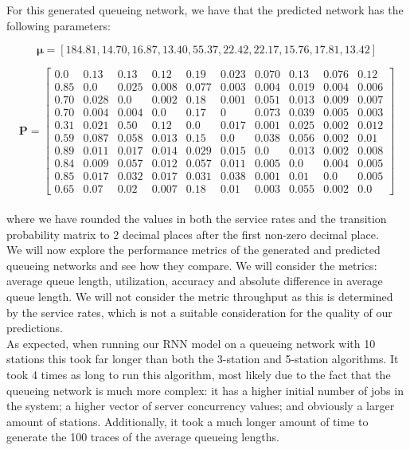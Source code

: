 \documentclass[a4paper,11pt,titlepage]{article}
\begin{document}
For this generated queueing network, we have that the predicted network has the following parameters: 

$$ \bm{\mu} = [184.81, 14.70, 16.87, 13.40, 55.37, 22.42, 22.17, 15.76, 17.81, 13.42]$$

$$\mathbf{P} = \begin{bmatrix}
0.0 & 0.13 & 0.13 & 0.12 & 0.19 & 0.023 & 0.070 & 0.13 & 0.076 & 0.12\\
0.85 & 0.0 & 0.025 & 0.008 & 0.077 & 0.003 & 0.004 & 0.019 & 0.004 & 0.006\\
0.70 & 0.028 & 0.0 & 0.002 & 0.18 & 0.001 & 0.051 & 0.013 & 0.009 & 0.007 \\
0.70 & 0.004 & 0.004 & 0.0 & 0.17 & 0 & 0.073 & 0.039 & 0.005 & 0.003 \\
0.31 & 0.021 & 0.50 & 0.12 & 0.0 & 0.017 & 0.001 & 0.025 & 0.002 & 0.012 \\
0.59 & 0.087 & 0.058 & 0.013 & 0.15 & 0.0 & 0.038 & 0.056 & 0.002 & 0.01 \\
0.89 & 0.011 & 0.017 & 0.014 & 0.029 & 0.015 & 0.0 & 0.013 & 0.002 & 0.008 \\
0.84 & 0.009 & 0.057 & 0.012 & 0.057 & 0.011 & 0.005 & 0.0 & 0.004 & 0.005\\
0.85 & 0.017 & 0.032 & 0.017 & 0.031 & 0.038 & 0.001 & 0.01 & 0.0 & 0.005 \\
0.65 & 0.07 & 0.02 & 0.007 & 0.18 & 0.01 & 0.003 & 0.055 & 0.002 & 0.0
\end{bmatrix} $$ \\

where we have rounded the values in both the service rates and the transition probability matrix to 2 decimal places after the first non-zero decimal place. \\

We will now explore the performance metrics of the generated and predicted queueing networks and see how they compare. We will consider the metrics: average queue length, utilization, accuracy and absolute difference in average queue length. We will not consider the metric throughput as this is determined by the service rates, which is not a suitable consideration for the quality of our predictions. \\

As expected, when running our RNN model on a queueing network with 10 stations this took far longer than both the 3-station and 5-station algorithms. It took 4 times as long to run this algorithm, most likely due to the fact that the queueing network is much more complex: it has a higher initial number of jobs in the system; a higher vector of server concurrency values; and obviously a larger amount of stations. Additionally, it took a much longer amount of time to generate the 100 traces of the average queueing lengths. \\
\end{document}
